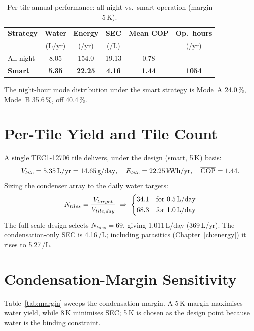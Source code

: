 \documentclass[12pt,a4paper]{report}
\newcommand{\si}[1]{\mbox{#1}}
\newcommand{\SI}[2]{#1\,\mbox{#2}}
\newcommand{\per}{/}
\newcommand{\gram}{g}\newcommand{\kg}{kg}\newcommand{\kilogram}{kg}
\newcommand{\liter}{L}\newcommand{\litre}{L}
\newcommand{\dy}{day}\newcommand{\yr}{yr}
\newcommand{\kelvin}{K}
\newcommand{\percent}{\%}
\begin{document}
\begin{table}[H]
  \centering
  \caption{Per-tile annual performance: all-night vs.\ smart operation
           (margin \SI{5}{\kelvin}).}
  \label{tab:strategy}
  \begin{tabular}{lccccc}
    \toprule
    \textbf{Strategy} & \textbf{Water} & \textbf{Energy} & \textbf{SEC} & \textbf{Mean COP} & \textbf{Op.\ hours}\\
     & (\si{\liter\per\yr}) & (\si{\kWh\per\yr}) & (\si{\kWh\per\liter}) & & (\si{\hour\per\yr})\\
    \midrule
    All-night & 8.05 & 154.0 & 19.13 & 0.78 & ---\\
    \textbf{Smart} & \textbf{5.35} & \textbf{22.25} & \textbf{4.16} & \textbf{1.44} & \textbf{1054}\\
    \bottomrule
  \end{tabular}
\end{table}

The night-hour mode distribution under the smart strategy is Mode~A
\SI{24.0}{\percent}, Mode~B \SI{35.6}{\percent}, off \SI{40.4}{\percent}.

\section{Per-Tile Yield and Tile Count}
A single TEC1-12706 tile delivers, under the design (smart, \SI{5}{\kelvin})
basis:
\begin{equation}
  V_{tile}=\SI{5.35}{\liter\per\yr}=\SI{14.65}{\gram\per\dy},\quad
  E_{tile}=\SI{22.25}{\kWh\per\yr},\quad \overline{\mathrm{COP}}=1.44 .
  \label{eq:tile}
\end{equation}
Sizing the condenser array to the daily water targets:
\begin{equation}
  N_{tiles}=\frac{V_{target}}{V_{tile,day}}\;\Rightarrow\;
  \begin{dcases}
    34.1 & \text{for }\SI{0.5}{\liter\per\dy}\\
    68.3 & \text{for }\SI{1.0}{\liter\per\dy}
  \end{dcases}
  \label{eq:ntiles}
\end{equation}
The full-scale design selects $\boxed{N_{tiles}=69}$, giving
\SI{1.011}{\liter\per\dy} (\SI{369}{\liter\per\yr}). The condensation-only SEC
is \SI{4.16}{\kWh\per\liter}; including parasitics (Chapter~\ref{ch:energy}) it
rises to \SI{5.27}{\kWh\per\liter}.

\section{Condensation-Margin Sensitivity}
Table~\ref{tab:margin} sweeps the condensation margin. A \SI{5}{\kelvin} margin
maximises water yield, while \SI{8}{\kelvin} minimises SEC; \SI{5}{\kelvin} is
chosen as the design point because water is the binding constraint.
\end{document}

